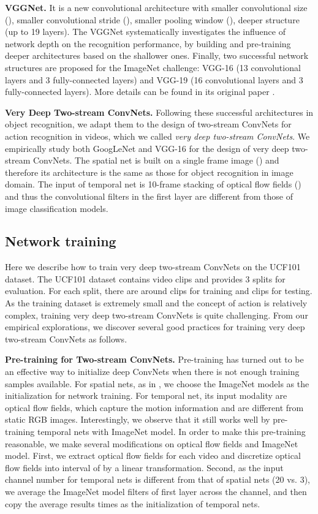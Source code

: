\documentclass[10pt,twocolumn,letterpaper]{article}
\begin{document}
\textbf{VGGNet.} It is a new convolutional architecture with smaller convolutional size (), smaller convolutional stride (), smaller pooling window (), deeper structure (up to 19 layers). The VGGNet systematically investigates the influence of network depth on the recognition performance, by building and pre-training deeper architectures based on the shallower ones. Finally, two successful network structures are proposed for the ImageNet challenge: VGG-16 (13 convolutional layers and 3 fully-connected layers) and VGG-19 (16 convolutional layers and 3 fully-connected layers). More details can be found in its original paper \cite{SimonyanZ14a}.


\textbf{Very Deep Two-stream ConvNets.} Following these successful architectures in object recognition, we adapt them to the design of two-stream ConvNets for action recognition in videos, which we called \emph{very deep two-stream ConvNets}. We empirically study both GoogLeNet and VGG-16 for the design of very deep two-stream ConvNets. The spatial net is built on a single frame image () and therefore its architecture is the same as those for object recognition in image domain. The input of temporal net is 10-frame stacking of optical flow fields () and thus the convolutional filters in the first layer are different from those of image classification models.

\subsection{Network training}
Here we describe how to train very deep two-stream ConvNets on the UCF101 dataset. The UCF101 dataset contains  video clips and provides 3 splits for evaluation. For each split, there are around  clips for training and  clips for testing. As the training dataset is extremely small and the concept of action is relatively complex, training very deep two-stream ConvNets is quite challenging. From our empirical explorations, we discover several good practices for training very deep two-stream ConvNets as follows.

\textbf{Pre-training for Two-stream ConvNets.} Pre-training has turned out to be an effective way to initialize deep ConvNets when there is not enough training samples available. For spatial nets, as in \cite{SimonyanZ14}, we choose the ImageNet models as the initialization for network training. For temporal net, its input modality are optical flow fields, which capture the motion information and are different from static RGB images. Interestingly, we observe that it still works well by pre-training temporal nets with ImageNet model. In order to make this pre-training reasonable, we make several modifications on optical flow fields and ImageNet model. First, we extract optical flow fields for each video and discretize optical flow fields into interval of  by a linear transformation. Second, as the input channel number for temporal nets is different from that of spatial nets (20 vs. 3), we average the ImageNet model filters of first layer across the channel, and then copy the average results  times as the initialization of temporal nets.
\end{document}
